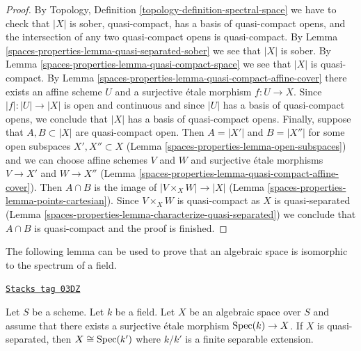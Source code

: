 \begin{proof}
By Topology, Definition \ref{topology-definition-spectral-space}
we have to check that $|X|$ is sober, quasi-compact, has a basis
of quasi-compact opens, and the intersection of any two
quasi-compact opens is quasi-compact. By
Lemma \ref{spaces-properties-lemma-quasi-separated-sober} we see that $|X|$ is sober.
By Lemma \ref{spaces-properties-lemma-quasi-compact-space} we see that $|X|$ is quasi-compact.
By Lemma \ref{spaces-properties-lemma-quasi-compact-affine-cover} there exists an affine scheme
$U$ and a surjective \'etale morphism $f : U \to X$.
Since $|f| : |U| \to |X|$ is open and continuous and since $|U|$ has
a basis of quasi-compact opens, we conclude that $|X|$ has a basis
of quasi-compact opens. Finally, suppose that
$A, B \subset |X|$ are quasi-compact open. Then $A = |X'|$ and $B = |X''|$
for some open subspaces $X', X'' \subset X$ (Lemma \ref{spaces-properties-lemma-open-subspaces})
and we can choose affine schemes $V$ and $W$ and surjective
\'etale morphisms $V \to X'$ and $W \to X''$
(Lemma \ref{spaces-properties-lemma-quasi-compact-affine-cover}).
Then $A \cap B$ is the image of
$|V \times_X W| \to |X|$ (Lemma \ref{spaces-properties-lemma-points-cartesian}).
Since $V \times_X W$ is quasi-compact as $X$ is quasi-separated
(Lemma \ref{spaces-properties-lemma-characterize-quasi-separated})
we conclude that $A \cap B$ is quasi-compact and the proof is finished.
\end{proof}

The following lemma can be used to prove that
an algebraic space is isomorphic to the spectrum of a field.

\begin{lemma}
\label{spaces-properties-lemma-point-like-spaces}
\href{https://stacks.math.columbia.edu/tag/03DZ}{\texttt{Stacks tag 03DZ}}

Let $S$ be a scheme. Let $k$ be a field.
Let $X$ be an algebraic space over $S$ and assume that there exists
a surjective \'etale morphism $\operatorname{Spec}(k) \to X$.
If $X$ is quasi-separated, then $X \cong \operatorname{Spec}(k')$
where $k/k'$ is a finite separable extension.
\end{lemma}


